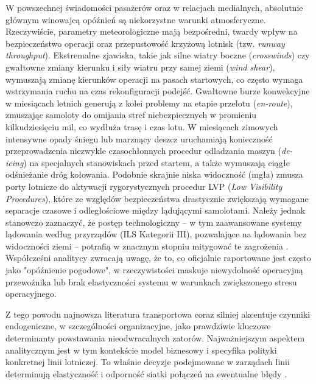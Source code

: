 W powszechnej świadomości pasażerów oraz w relacjach medialnych, absolutnie głównym winowajcą opóźnień są niekorzystne warunki atmosferyczne. Rzeczywiście, parametry meteorologiczne mają bezpośredni, twardy wpływ na bezpieczeństwo operacji oraz przepustowość krzyżową lotnisk (tzw. \textit{runway throughput}). Ekstremalne zjawiska, takie jak silne wiatry boczne (\textit{crosswinds}) czy gwałtowne zmiany kierunku i siły wiatru przy samej ziemi (\textit{wind shear}), wymuszają zmianę kierunków operacji na pasach startowych, co często wymaga wstrzymania ruchu na czas rekonfiguracji podejść. Gwałtowne burze konwekcyjne w miesiącach letnich generują z kolei problemy na etapie przelotu (\textit{en-route}), zmuszając samoloty do omijania stref niebezpiecznych w promieniu kilkudziesięciu mil, co wydłuża trasę i czas lotu. W miesiącach zimowych intensywne opady śniegu lub marznący deszcz uruchamiają konieczność przeprowadzenia niezwykle czasochłonnych procedur odladzania maszyn (\textit{de-icing}) na specjalnych stanowiskach przed startem, a także wymuszają ciągłe odśnieżanie dróg kołowania. Podobnie skrajnie niska widoczność (mgła) zmusza porty lotnicze do aktywacji rygorystycznych procedur LVP (\textit{Low Visibility Procedures}), które ze względów bezpieczeństwa drastycznie zwiększają wymagane separacje czasowe i odległościowe między lądującymi samolotami. Należy jednak stanowczo zaznaczyć, że postęp technologiczny – w tym zaawansowane systemy lądowania według przyrządów (ILS Kategorii III), pozwalające na lądowania bez widoczności ziemi – potrafią w znacznym stopniu mitygować te zagrożenia \cite{doganis}. Współcześni analitycy zwracają uwagę, że to, co oficjalnie raportowane jest często jako "opóźnienie pogodowe", w rzeczywistości maskuje niewydolność operacyjną przewoźnika lub brak elastyczności systemu w warunkach zwiększonego stresu operacyjnego.

Z tego powodu najnowsza literatura transportowa coraz silniej akcentuje czynniki endogeniczne, w szczególności organizacyjne, jako prawdziwie kluczowe determinanty powstawania nieodwracalnych zatorów. Najważniejszym aspektem analitycznym jest w tym kontekście model biznesowy i specyfika polityki konkretnej linii lotniczej. To właśnie decyzje podejmowane w zarządach linii determinują elastyczność i odporność siatki połączeń na ewentualne błędy \cite{doganis}. 

